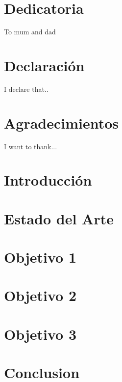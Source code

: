 \documentclass[12pt,twoside]{report}
\begin{document}





\chapter*{Dedicatoria}
To mum and dad

\chapter*{Declaración}
I declare that..

\chapter*{Agradecimientos}
I want to thank...


\tableofcontents

\listoffigures

\listoftables

\chapter{Introducción}


\chapter{Estado del Arte}


\chapter{Objetivo 1}


\chapter{Objetivo 2}


\chapter{Objetivo 3}


\chapter{Conclusion}




\medskip



\end{document}
